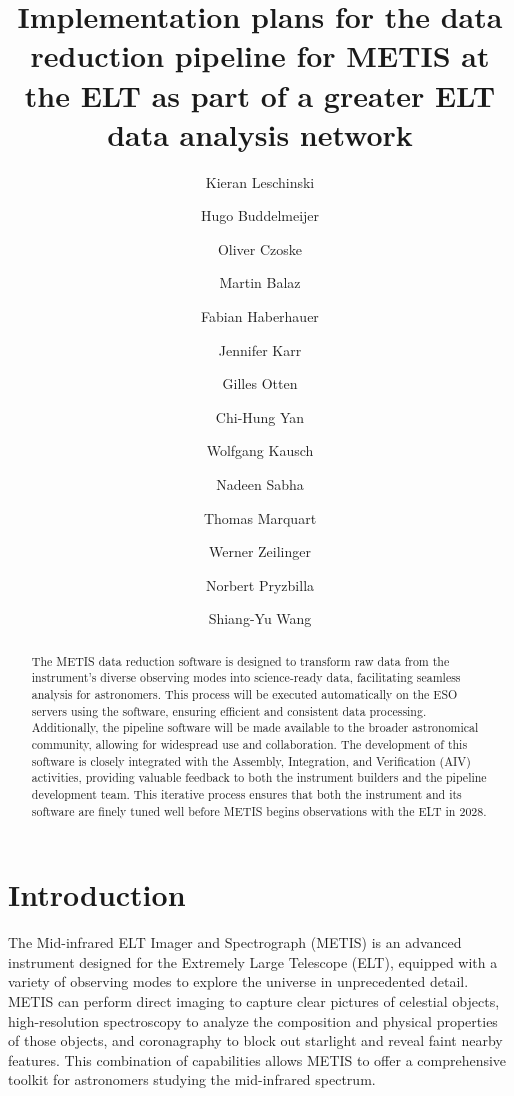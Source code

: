 \documentclass[a4paper]{spie}  %
\title{Implementation plans for the data reduction pipeline for METIS at the ELT as part of a greater ELT data analysis network}
\author[a]{Kieran Leschinski}
\author[a]{Hugo Buddelmeijer}
\author[a]{Oliver Czoske}
\author[a]{Martin Balaz}
\author[a]{Fabian Haberhauer}
\author[a]{Jennifer Karr}
\author[a]{Gilles Otten}
\author[a]{Chi-Hung Yan}
\author[a]{Wolfgang Kausch}
\author[a]{Nadeen Sabha}
\author[a]{Thomas Marquart}
\author[a]{Werner Zeilinger}
\author[a]{Norbert Pryzbilla}
\author[a]{Shiang-Yu Wang}
\affil[a]{University of Vienna, T\"urkenschanztra\ss e 18, 1180 Vienna, Austria}
\begin{document}
 
\maketitle

\begin{abstract}
The METIS data reduction software is designed to transform raw data from the instrument's diverse observing modes into science-ready data, facilitating seamless analysis for astronomers. This process will be executed automatically on the ESO servers using the software, ensuring efficient and consistent data processing. Additionally, the pipeline software will be made available to the broader astronomical community, allowing for widespread use and collaboration. The development of this software is closely integrated with the Assembly, Integration, and Verification (AIV) activities, providing valuable feedback to both the instrument builders and the pipeline development team. This iterative process ensures that both the instrument and its software are finely tuned well before METIS begins observations with the ELT in 2028. 

\end{abstract}



\section{Introduction}
\label{sec:introduction}




The Mid-infrared ELT Imager and Spectrograph (METIS) is an advanced instrument designed for the Extremely Large Telescope (ELT), equipped with a variety of observing modes to explore the universe in unprecedented detail. METIS can perform direct imaging to capture clear pictures of celestial objects, high-resolution spectroscopy to analyze the composition and physical properties of those objects, and coronagraphy to block out starlight and reveal faint nearby features. This combination of capabilities allows METIS to offer a comprehensive toolkit for astronomers studying the mid-infrared spectrum.
\end{document}

